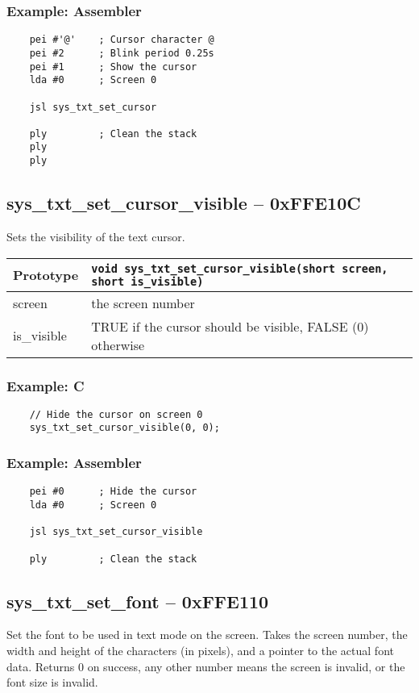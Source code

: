 \subsubsection*{Example: Assembler}
\begin{verbatim}
	pei #'@'	; Cursor character @
	pei #2		; Blink period 0.25s
    pei #1      ; Show the cursor
    lda #0      ; Screen 0

    jsl sys_txt_set_cursor

    ply         ; Clean the stack
	ply
	ply
\end{verbatim}


\subsection*{sys\_txt\_set\_cursor\_visible -- 0xFFE10C}
Sets the visibility of the text cursor.

\bigskip

\begin{tabular}{|l||l|} \hline
Prototype & \lstinline!void sys_txt_set_cursor_visible(short screen, short is_visible)! \\ \hline
screen & the screen number \\ \hline
is\_visible & TRUE if the cursor should be visible, FALSE (0) otherwise \\ \hline
\end{tabular}

\subsubsection*{Example: C}
\begin{lstlisting}
    // Hide the cursor on screen 0
    sys_txt_set_cursor_visible(0, 0);
\end{lstlisting}

\subsubsection*{Example: Assembler}
\begin{verbatim}
    pei #0      ; Hide the cursor
    lda #0      ; Screen 0

    jsl sys_txt_set_cursor_visible

    ply         ; Clean the stack
\end{verbatim}


\subsection*{sys\_txt\_set\_font -- 0xFFE110}
Set the font to be used in text mode on the screen. Takes the screen number, the width and height of the characters (in pixels),
and a pointer to the actual font data. Returns 0 on success, any other number means the screen is invalid, or the font size is invalid.

